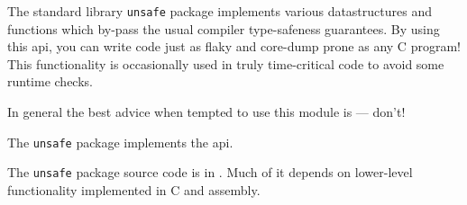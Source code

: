 
The standard library {\tt unsafe} package implements various datastructures 
and functions which by-pass the usual compiler type-safeness guarantees.  By 
using this api, you can write code just as flaky and core-dump prone as any 
C program!  This functionality is occasionally used in truly time-critical code 
to avoid some runtime checks.

In general the best advice when tempted to use this module is --- don't!

The {\tt unsafe} package implements the  api.

The {\tt unsafe} package source code is in . 
Much of it depends on lower-level functionality implemented in C and assembly.


